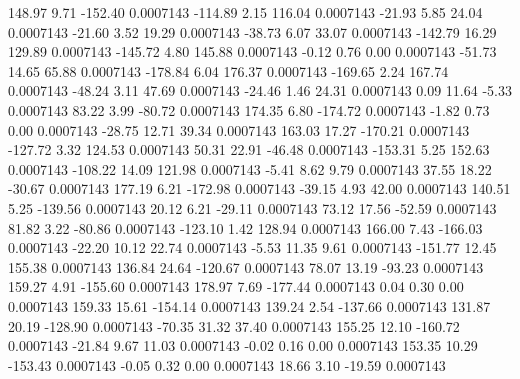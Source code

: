       148.97        9.71     -152.40     0.0007143
     -114.89        2.15      116.04     0.0007143
      -21.93        5.85       24.04     0.0007143
      -21.60        3.52       19.29     0.0007143
      -38.73        6.07       33.07     0.0007143
     -142.79       16.29      129.89     0.0007143
     -145.72        4.80      145.88     0.0007143
       -0.12        0.76        0.00     0.0007143
      -51.73       14.65       65.88     0.0007143
     -178.84        6.04      176.37     0.0007143
     -169.65        2.24      167.74     0.0007143
      -48.24        3.11       47.69     0.0007143
      -24.46        1.46       24.31     0.0007143
        0.09       11.64       -5.33     0.0007143
       83.22        3.99      -80.72     0.0007143
      174.35        6.80     -174.72     0.0007143
       -1.82        0.73        0.00     0.0007143
      -28.75       12.71       39.34     0.0007143
      163.03       17.27     -170.21     0.0007143
     -127.72        3.32      124.53     0.0007143
       50.31       22.91      -46.48     0.0007143
     -153.31        5.25      152.63     0.0007143
     -108.22       14.09      121.98     0.0007143
       -5.41        8.62        9.79     0.0007143
       37.55       18.22      -30.67     0.0007143
      177.19        6.21     -172.98     0.0007143
      -39.15        4.93       42.00     0.0007143
      140.51        5.25     -139.56     0.0007143
       20.12        6.21      -29.11     0.0007143
       73.12       17.56      -52.59     0.0007143
       81.82        3.22      -80.86     0.0007143
     -123.10        1.42      128.94     0.0007143
      166.00        7.43     -166.03     0.0007143
      -22.20       10.12       22.74     0.0007143
       -5.53       11.35        9.61     0.0007143
     -151.77       12.45      155.38     0.0007143
      136.84       24.64     -120.67     0.0007143
       78.07       13.19      -93.23     0.0007143
      159.27        4.91     -155.60     0.0007143
      178.97        7.69     -177.44     0.0007143
        0.04        0.30        0.00     0.0007143
      159.33       15.61     -154.14     0.0007143
      139.24        2.54     -137.66     0.0007143
      131.87       20.19     -128.90     0.0007143
      -70.35       31.32       37.40     0.0007143
      155.25       12.10     -160.72     0.0007143
      -21.84        9.67       11.03     0.0007143
       -0.02        0.16        0.00     0.0007143
      153.35       10.29     -153.43     0.0007143
       -0.05        0.32        0.00     0.0007143
       18.66        3.10      -19.59     0.0007143
